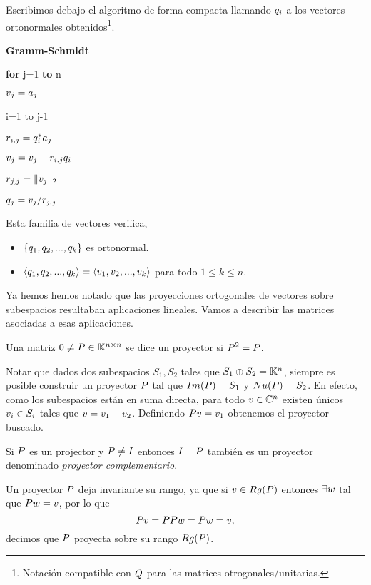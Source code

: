 Escribimos debajo el algoritmo de forma compacta llamando $\qb_i$ a los vectores ortonormales obtenidos\footnote{Notación compatible con $\Qb$ para las matrices otrogonales/unitarias.}.


\begin{center}
\begin{tcolorbox}[width=\linewidth/3]
\begin{center}
{\bf Gramm-Schmidt}
\end{center}


{\bf for} j=1 {\bf to} n

\qquad $\vb_j=\ab_j$

 i=1 to j-1

\qquad\qquad $r_{i,j}=\qb_i^*\ab_j$

\qquad\qquad  $\vb_j=\vb_j-r_{i.j}
\qb_i$


\qquad$r_{j,j}=\|\vb_j\|_2$

\qquad$\qb_{j}=\vb_j/r_{j,j}$

\end{tcolorbox}
\end{center}
Esta familia de vectores verifica,
\begin{itemize}
 \item $\{\qb_1,\qb_2,...,\qb_k\}$ es ortonormal.
 \item $\langle\qb_1,\qb_2,...,\qb_k\rangle=\langle\vb_1,\vb_2,..., \vb_k\rangle$ para todo $1\le k\le n$.
\end{itemize}

Ya hemos hemos notado que las proyecciones ortogonales de vectores sobre subespacios  resultaban aplicaciones lineales.  Vamos a describir las matrices asociadas a esas aplicaciones.
\tccdefi
\begin{defi}
Una matriz $\cero \neq \Pb\in \Knn$ se dice un proyector si
$\Pb^2=\Pb$.
\end{defi}
\etcc

Notar que  dados dos subespacios $S_1,S_2$ tales que $S_1\oplus S_2=\mathbb K^{n}$, siempre es posible construir un proyector $\Pb$ tal que $Im(\Pb)=S_1$ y $Nu(\Pb)=S_2$. En efecto, como los subespacios están en suma directa, para todo $\vb\in \Cn$ existen únicos $\vb_i\in S_i$ tales que
$\vb=\vb_1+\vb_2$. Definiendo $\Pb\vb=\vb_1$ obtenemos el proyector buscado.

Si $\Pb$ es un projector y $\Pb\neq \Ib$ entonces $\Ib-\Pb$ también es un proyector denominado \emph{proyector complementario}.

Un proyector $\Pb$ deja invariante su rango, ya que si $\vb\in Rg(\Pb)$ entonces $\exists \wb$ tal que  $\Pb\wb=\vb$, por lo que
$$
\Pb\vb=\Pb\Pb\wb=\Pb\wb=\vb,
$$
decimos que $\Pb$ proyecta sobre su rango $Rg(\Pb)$.

